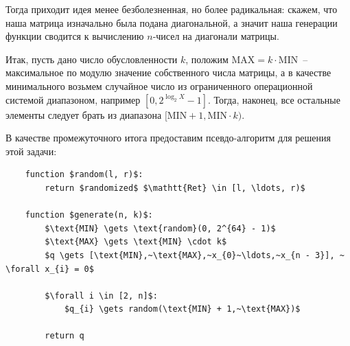 \documentclass[12pt, a4paper, oneside, final]{article}
\begin{document}
	Тогда приходит идея менее безболезненная, но более радикальная: скажем, что наша матрица изначально была подана диагональной, а значит наша генерации функции сводится к вычислению $n$-чисел на диагонали матрицы.

	Итак, пусть дано число обусловленности $k$, положим $\text{MAX} = k \cdot \text{MIN}$~-- максимальное по модулю значение собственного числа матрицы, а в качестве минимального возьмем случайное число из ограниченного операционной системой диапазоном, например $[0, 2^{\log_{2}{X}} - 1]$. Тогда, наконец, все остальные элементы следует брать из диапазона $[\text{MIN} + 1, \text{MIN} \cdot k)$.

	В качестве промежуточного итога предоставим псевдо-алгоритм для решения этой задачи:
	\begin{lstlisting}
	function $random(l, r)$:
		return $randomized$ $\mathtt{Ret} \in [l, \ldots, r)$
	
	function $generate(n, k)$:
		$\text{MIN} \gets \text{random}(0, 2^{64} - 1)$
		$\text{MAX} \gets \text{MIN} \cdot k$
		$q \gets [\text{MIN},~\text{MAX},~x_{0}~\ldots,~x_{n - 3}], ~ \forall x_{i} = 0$

		$\forall i \in [2, n]$:
			$q_{i} \gets random(\text{MIN} + 1,~\text{MAX})$

		return q
	\end{lstlisting}
\end{document}
